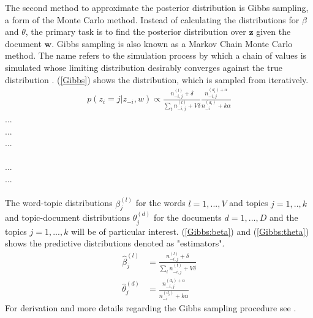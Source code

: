 \documentclass[11pt,a4paper]{article}
\begin{document}
The second method to approximate the posterior distribution is Gibbs sampling, a form of the Monte Carlo method. Instead of calculating the distributions for $\beta$ and $\theta$, the primary task is to find the posterior distribution over $\textbf{z}$ given the document $\textbf{w}$. Gibbs sampling is also known as a Markov Chain Monte Carlo method. The name refers to the simulation process by which a chain of values is simulated whose limiting distribution desirably converges against the true distribution \cite{Griffiths2006}. (\ref{Gibbs}) shows the distribution, which is sampled from iteratively.
\begin{align}\label{Gibbs}
p(z_i=j|z_{-i},w)\propto \frac{n_{-i,j}^{(l)}+\delta}{\sum_t n_{-i,j}^{(t)}+V\delta}
\frac{n_{-i,j}^{(d_i)+\alpha}}{n_{-i}^{(d_i)}+k\alpha}
\end{align}
 		... \\
   		... \\
	... \\
\makebox[1cm][l]{}						\\
				... \\
\makebox[1cm][l]{$\delta,\alpha$} 	... \\
\\
The word-topic distributions $\beta_{j}^{(l)}$ for the words $l=1,...,V$ and topics $j=1,..,k$ and topic-document distributions $\theta_j^{(d)}$ for the documents $d=1,...,D$ and the topics $j=1,...,k$ will be of particular interest. (\ref{Gibbs:beta}) and (\ref{Gibbs:theta}) shows the predictive distributions denoted as "estimators". 
\begin{align}
\hat\beta_{j}^{(l)}&=\frac{n_{-i,j}^{(l)}+\delta}{\sum_t n_{-i,j}^{(t)}+V\delta} \label{Gibbs:beta} \\
\hat\theta_j^{(d)}&= \frac{n_{-i,j}^{(d_i)+\alpha}}{n_{-i}^{(d_i)}+k\alpha} \label{Gibbs:theta}
\end{align}
For derivation and more details regarding the Gibbs sampling procedure see \cite{Griffiths2006}.
\end{document}
